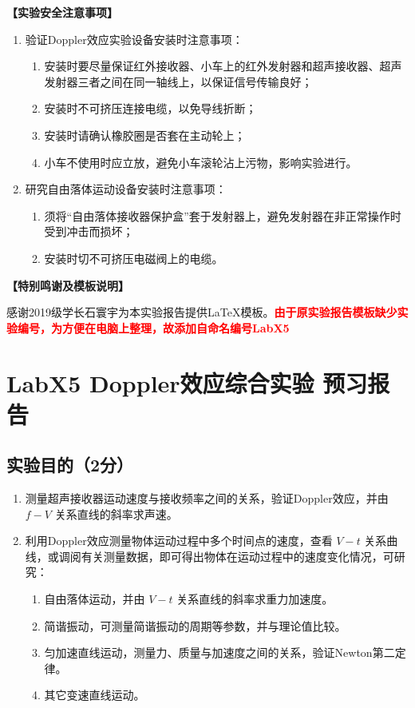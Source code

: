 \documentclass[dvipsnames, svgnames,a4paper,11pt]{article}
\begin{document}
	\textbf{【实验安全注意事项】}	
	\begin{enumerate}
		\item 验证Doppler效应实验设备安装时注意事项：
		\begin{enumerate}
			\item 安装时要尽量保证红外接收器、小车上的红外发射器和超声接收器、超声发射器三者之间在同一轴线上，以保证信号传输良好；
			\item 安装时不可挤压连接电缆，以免导线折断；
			\item 安装时请确认橡胶圈是否套在主动轮上；
			\item 小车不使用时应立放，避免小车滚轮沾上污物，影响实验进行。
		\end{enumerate}
		\item 研究自由落体运动设备安装时注意事项：
		\begin{enumerate}
			\item 须将“自由落体接收器保护盒”套于发射器上，避免发射器在非正常操作时受到冲击而损坏；
			\item 安装时切不可挤压电磁阀上的电缆。
		\end{enumerate}	
	\end{enumerate}
	
	\textbf{【特别鸣谢及模板说明】}	
	
	感谢2019级学长石寰宇为本实验报告提供\LaTeX 模板。\textcolor{red}{\textbf{由于原实验报告模板缺少实验编号，为方便在电脑上整理，故添加自命名编号LabX5}}
	
	
	
	\clearpage
	\tableofcontents
	\clearpage
	
	
	
	\setcounter{section}{0}
	\section{LabX5 Doppler效应综合实验 \quad\heiti 预习报告}
	
	\subsection{实验目的（2分）}
	\begin{enumerate}
		\item 测量超声接收器运动速度与接收频率之间的关系，验证Doppler效应，并由 $f-V$ 关系直线的斜率求声速。
		\item 利用Doppler效应测量物体运动过程中多个时间点的速度，查看 $V-t$ 关系曲线，或调阅有关测量数据，即可得出物体在运动过程中的速度变化情况，可研究：
		\begin{enumerate}
			\item 自由落体运动，并由 $V-t$ 关系直线的斜率求重力加速度。
			\item 简谐振动，可测量简谐振动的周期等参数，并与理论值比较。
			\item 匀加速直线运动，测量力、质量与加速度之间的关系，验证Newton第二定律。
			\item 其它变速直线运动。
		\end{enumerate}
	\end{enumerate}
	
\end{document}

